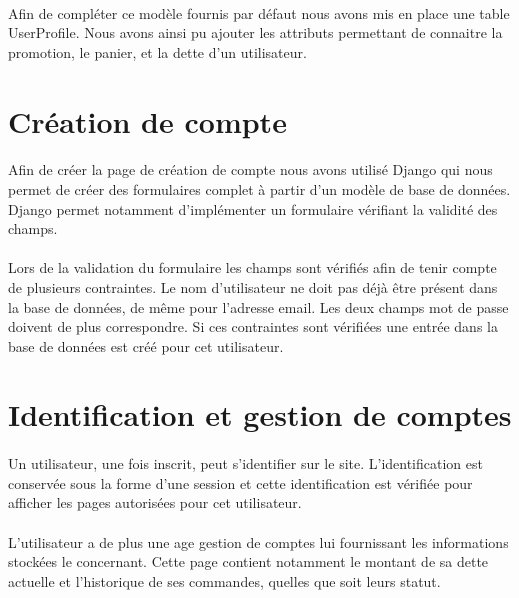 \documentclass[twoside,UTF8]{EPURapport}
\begin{document}
        \paragraph{}Afin de compléter ce modèle fournis par défaut nous avons mis en place une table UserProfile. Nous avons ainsi pu ajouter les attributs permettant de connaitre la promotion, le panier, et la dette d'un utilisateur.

    \section{Création de compte}

        \paragraph{}Afin de créer la page de création de compte nous avons utilisé Django qui nous permet de créer des formulaires complet à partir d'un modèle de base de données. Django permet notamment d'implémenter un formulaire vérifiant la validité des champs.

        \paragraph{}Lors de la validation du formulaire les champs sont vérifiés afin de tenir compte de plusieurs contraintes. Le nom d'utilisateur ne doit pas déjà être présent dans la base de données, de même pour l'adresse email. Les deux champs mot de passe doivent de plus correspondre. Si ces contraintes sont vérifiées une entrée dans la base de données est créé pour cet utilisateur.

    \section{Identification et gestion de comptes}

        \paragraph{}Un utilisateur, une fois inscrit, peut s'identifier sur le site. L'identification est conservée sous la forme d'une session et cette identification est vérifiée pour afficher les pages autorisées pour cet utilisateur.

        \paragraph{}L'utilisateur a de plus une age gestion de comptes lui fournissant les informations stockées le concernant. Cette page contient notamment le montant de sa dette actuelle et l'historique de ses commandes, quelles que soit leurs statut.
\end{document}

